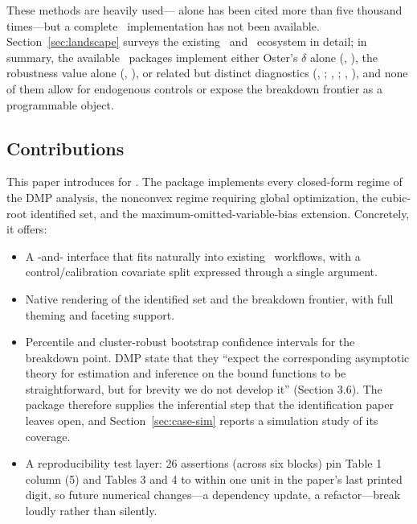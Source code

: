 \documentclass[article]{jss}\usepackage[]{graphicx}\usepackage[]{xcolor}
\newcommand{\Rlang}{\proglang{R}}
\newcommand{\Stata}{\proglang{Stata}}
\begin{document}
These methods are heavily used---\citet{Oster2019} alone has been cited
more than five thousand times---but a complete \Rlang\ implementation has
not been available. Section~\ref{sec:landscape} surveys the existing
\Rlang\ and \Stata\ ecosystem in detail; in summary, the available
\Rlang\ packages implement either Oster's $\delta$ alone (,
\citealp{robomit}), the \citet{Cinelli2020} robustness value alone
(, \citealp{sensemakr}), or related but distinct
diagnostics (, \citealp{konfound}; ,
\citealp{causalsens}; , \citealp{tipr}), and none of them allow
for endogenous controls or expose the breakdown frontier as a
programmable object.

\subsection{Contributions}

This paper introduces  for \Rlang. The package
implements every closed-form regime of the DMP analysis, the nonconvex
regime requiring global optimization, the \citet{Oster2019} cubic-root
identified set, and the \citet{Masten2026} maximum-omitted-variable-bias
extension. Concretely, it offers:

\begin{itemize}
\item A -and- interface that fits naturally
into existing \Rlang\ workflows, with a control/calibration covariate
split expressed through a single  argument.
\item Native  \citep{ggplot2} rendering of the identified set
and the breakdown frontier, with full theming and faceting support.
\item Percentile and cluster-robust bootstrap confidence intervals for the
breakdown point. DMP state that they ``expect the corresponding asymptotic
theory for estimation and inference on the bound functions to be
straightforward, but for brevity we do not develop it'' (Section 3.6).
The package therefore supplies the inferential step that the identification
paper leaves open, and Section~\ref{sec:case-sim} reports a simulation
study of its coverage.
\item A reproducibility test layer: 26  assertions (across
six  blocks) pin \citet{Diegert2026} Table 1 column (5)
and Tables 3 and 4 to within one unit in the paper's last printed digit, so
future numerical changes---a dependency update, a refactor---break loudly
rather than silently.
\end{itemize}
\end{document}
